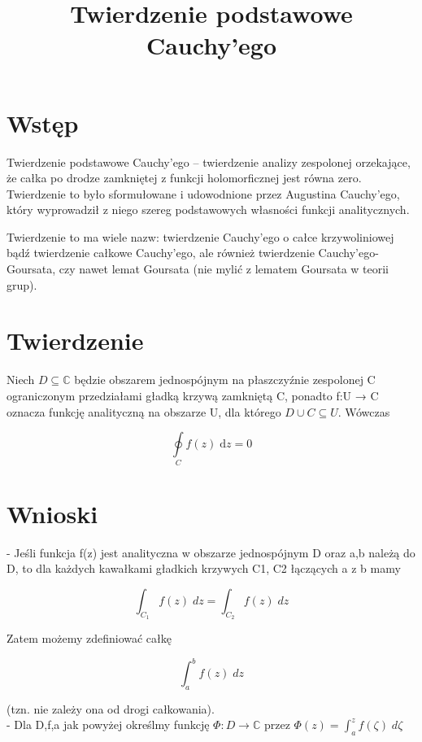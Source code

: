 \documentclass{article}
\begin{document}
\title{Twierdzenie podstawowe Cauchy’ego}
\maketitle

\section*{Wstęp}
Twierdzenie podstawowe Cauchy’ego – twierdzenie analizy zespolonej orzekające, że całka po drodze zamkniętej z funkcji holomorficznej jest równa zero. Twierdzenie to było sformułowane i udowodnione przez Augustina Cauchy’ego, który wyprowadził z niego szereg podstawowych własności funkcji analitycznych.

Twierdzenie to ma wiele nazw: twierdzenie Cauchy’ego o całce krzywoliniowej bądź twierdzenie całkowe Cauchy’ego, ale również twierdzenie Cauchy’ego-Goursata, czy nawet lemat Goursata (nie mylić z lematem Goursata w teorii grup).


\section*{Twierdzenie}

Niech $D\subseteq \mathbb {C}$ będzie obszarem jednospójnym na płaszczyźnie zespolonej C ograniczonym przedziałami gładką krzywą zamkniętą C, ponadto f:U → C oznacza funkcję analityczną na obszarze U, dla którego \(D\cup C\subseteq U\).
Wówczas 

\begin{equation}
	\oint \limits _{C}f(z)\;\mathrm {d} z=0
\end{equation}


\section*{Wnioski}
- Jeśli funkcja f(z) jest analityczna w obszarze jednospójnym D oraz a,b należą do D, to dla każdych kawałkami gładkich krzywych C1, C2 łączących a z b mamy

\begin{displaymath}
	\int _{C_{1}}f(z)\;dz=\int _{C_{2}}f(z)\;dz
\end{displaymath}

Zatem możemy zdefiniować całkę

\[\int_a^b f(z)\; dz\]

(tzn. nie zależy ona od drogi całkowania).\\

- Dla D,f,a jak powyżej określmy funkcję
\(\Phi :D\longrightarrow \mathbb {C}\) przez $\Phi (z)=\int _{a}^{z}f(\zeta )\;d\zeta $ \\
\end{document}
